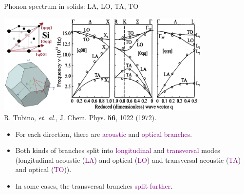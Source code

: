 \documentclass{beamer}
\begin{document}
\begin{frame}{Phonon spectrum in solids: LA, LO, TA, TO}\small
  \begin{center}
    \includegraphics[width=0.8\textwidth]{figure/ps-solid.png}\\
    \tiny R. Tubino, \emph{et. al.}, J. Chem. Phys. \textbf{56}, 1022 (1972).
  \end{center}
  \begin{block}{}
    \begin{itemize}\footnotesize
      \item For each direction, there are \textcolor{purple}{acoustic} and \textcolor{purple}{optical branches}.
      \item Both kinds of branches split into \textcolor{purple}{longitudinal} and \textcolor{purple}{transversal} modes (longitudinal acoustic (\textcolor{purple}{LA}) and optical (\textcolor{purple}{LO}) and transversal acoustic (\textcolor{purple}{TA}) and optical (\textcolor{purple}{TO})).
      \item In some cases, the transversal branches \textcolor{purple}{split further}.
    \end{itemize}
  \end{block}
\end{frame}
\end{document}
